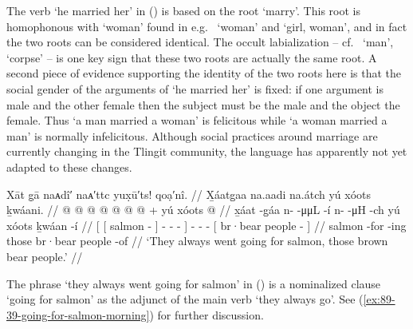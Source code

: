 The verb  ‘he married her’ in (\lastx) is based on the root  ‘marry’.
This root is homophonous with  ‘woman’ found in e.g.\  ‘woman’ and  ‘girl, woman’, and in fact the two roots can be considered identical.
The occult labialization – cf.\  ‘man’,  ‘corpse’ – is one key sign that these two roots are actually the same root.
A second piece of evidence supporting the identity of the two roots here is that the social gender of the arguments of  ‘he married her’ is fixed: if one argument is male and the other female then the subject must be the male and the object the female.
Thus  ‘a man married a woman’ is felicitous while  ‘a woman married a man’ is normally infelicitous.
Although social practices around marriage are currently changing in the Tlingit community, the language has apparently not yet adapted to these changes.

\ex\label{ex:89-22-go-for-salmon}%
%
\begingl
	\glpreamble	Xāt g̣ā naᴀdî′ naᴀ′ttc yux̣ū′ts! qoạ′nî. //
	\glpreamble	X̱áatg̱aa na.aadi na.átch yú xóots ḵwáani. //
	\gla	{} {}  @ {} {} 
			 @ {} @ {} @ {} {}
		 @ {} @ {} @ {} +
		{} yú xóots  @ {} {} //
	\glb	{} {} x̱áat -g̱áa {}
			n-  -μμL -í {}
		n-  -μH -ch
		{} yú xóots ḵwáan -í {} //
	\glc	{}[ {}[ salmon - {}]
			-  - - {}]
		-  - -
		{}[  br·bear people - {}] //
	\gld	{} {} salmon -for {}
			 {} {} -ing {}
		 {} {} {}
		{} those br·bear people -of {} //
	\glft	‘They always went going for salmon, those brown bear people.’
		//
\endgl
\xe

The phrase  ‘they always went going for salmon’ in (\lastx) is a nominalized clause  ‘going for salmon’ as the adjunct of the main verb  ‘they always go’.
See (\ref{ex:89-39-going-for-salmon-morning}) for further discussion.

